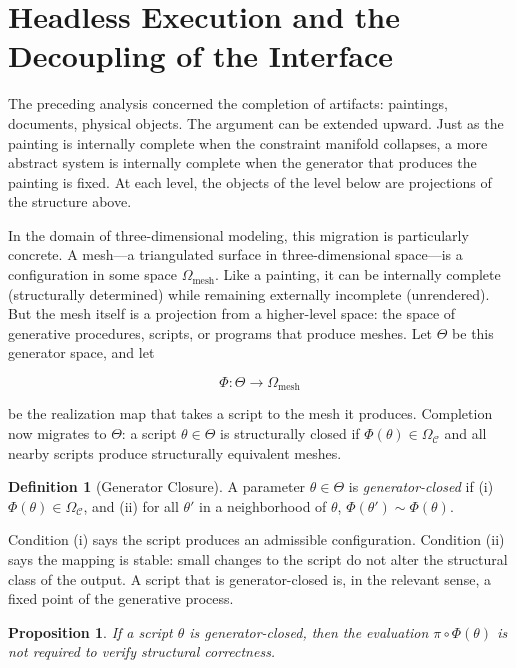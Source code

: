 \documentclass[11pt, twoside]{article}
\theoremstyle{plain}
\newtheorem{proposition}[theorem]{Proposition}
\theoremstyle{definition}
\newtheorem{definition}[theorem]{Definition}
\theoremstyle{remark}
\newcommand{\OmC}{\Omega_{\mathcal{C}}}
\begin{document}
\section{Headless Execution and the Decoupling of the Interface}
\label{sec:headless}

The preceding analysis concerned the completion of artifacts: paintings, documents, physical objects. The argument can be extended upward. Just as the painting is internally complete when the constraint manifold collapses, a more abstract system is internally complete when the generator that produces the painting is fixed. At each level, the objects of the level below are projections of the structure above.

In the domain of three-dimensional modeling, this migration is particularly concrete. A mesh---a triangulated surface in three-dimensional space---is a configuration in some space $\Omega_{\text{mesh}}$. Like a painting, it can be internally complete (structurally determined) while remaining externally incomplete (unrendered). But the mesh itself is a projection from a higher-level space: the space of generative procedures, scripts, or programs that produce meshes. Let $\Theta$ be this generator space, and let

\[
\Phi : \Theta \to \Omega_{\text{mesh}}
\]

be the realization map that takes a script to the mesh it produces. Completion now migrates to $\Theta$: a script $\theta \in \Theta$ is structurally closed if $\Phi(\theta) \in \OmC$ and all nearby scripts produce structurally equivalent meshes.

\begin{definition}[Generator Closure]
\label{def:generator-closure}
A parameter $\theta \in \Theta$ is \emph{generator-closed} if (i) $\Phi(\theta) \in \OmC$, and (ii) for all $\theta'$ in a neighborhood of $\theta$, $\Phi(\theta') \sim \Phi(\theta)$.
\end{definition}

Condition (i) says the script produces an admissible configuration. Condition (ii) says the mapping is stable: small changes to the script do not alter the structural class of the output. A script that is generator-closed is, in the relevant sense, a fixed point of the generative process.

\begin{proposition}
\label{prop:headless}
If a script $\theta$ is generator-closed, then the evaluation $\pi \circ \Phi(\theta)$ is not required to verify structural correctness.
\end{proposition}
\end{document}
